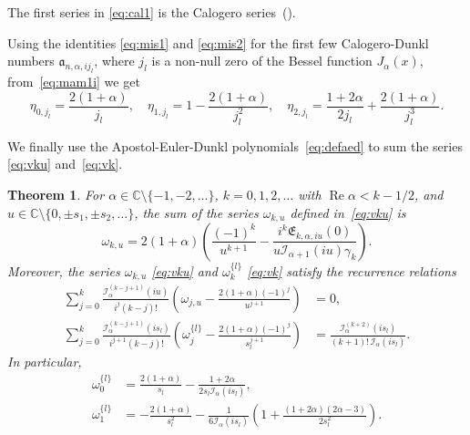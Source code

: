 \documentclass[10pt,a4paper]{article}
\theoremstyle{plain}
\newtheorem{theorem}{Theorem}[section]
\theoremstyle{definition}
\numberwithin{equation}{section} %
\newcommand{\I}{\mathcal{I}}
\newcommand{\am}{\mathfrak{a}}
\newcommand{\E}{\mathfrak{E}}
\newcommand{\CC}{\mathbb{C}}
\newcommand{\cc}{\gamma}
\renewcommand{\Re}{\operatorname{Re}}
\begin{document}
The first series in \eqref{eq:cal1} is the Calogero series~(\cite{Cal}).

Using the identities \eqref{eq:mis1} and \eqref{eq:mis2} for the first few Calogero-Dunkl numbers $\am_{n,\alpha,ij_l}$, where $j_l$ is a non-null zero of
the Bessel function $J_\alpha(x)$, from~\eqref{eq:mam1i} we get
\[
  \eta_{0,j_l} = \frac{2(1+\alpha)}{j_l},\quad \eta_{1,j_l}=1-\frac{2(1+\alpha)}{j_l^2},
  \quad \eta_{2,j_l} = \frac{1+2\alpha}{2j_l}+\frac{2(1+\alpha)}{j_l^3}.
\]

We finally use the Apostol-Euler-Dunkl polynomials~\eqref{eq:defaed} to sum the series \eqref{eq:vku} and~\eqref{eq:vk}.

\begin{theorem}
\label{thm:cag2}
For $\alpha \in \CC\setminus\{-1,-2,\dots\}$, $k=0,1,2,\dots$ with $\Re \alpha < k -1/2$,
and $u\in \CC\setminus\{0, \pm s_1,\pm s_2,\dots\}$, the sum of the series $\omega_{k,u}$ defined in~\eqref{eq:vku} is
\begin{equation}
\label{eq:sumAED}
  \omega_{k,u}
  = 2(1+\alpha) \left(\frac{(-1)^k}{u^{k+1}}
  - \frac{i^k\E_{k,\alpha,iu}(0)}{u\I_{\alpha+1}(iu)\cc_k}\right).
\end{equation}
Moreover, the series $\omega_{k,u}$ \eqref{eq:vku} and $\omega_k^{\{l\}}$ \eqref{eq:vk} satisfy the recurrence relations
\begin{align}
\label{eq:mamp}
  \sum_{j=0}^k \frac{\I_\alpha^{(k-j+1)}(iu)}{i^j(k-j)!}
  \left(\omega_{j,u}-\frac{2(1+\alpha)(-1)^j}{u^{j+1}}\right) &= 0,
  \\
\label{eq:mam5}
  \sum_{j=0}^k \frac{\I_\alpha^{(k-j+1)}(is_l)}{i^{j+1}(k-j)!}
  \left(\omega_j^{\{l\}}-\frac{2(1+\alpha)(-1)^j}{s_l^{j+1}}\right)
  &= \frac{\I_\alpha^{(k+2)}(is_l)}{(k+1)!\,\I_\alpha(is_l)}.
\end{align}
In particular,
\begin{align}
\label{eq:acal1}
  \omega_0^{\{l\}} &= \frac{2(1+\alpha)}{s_l} - \frac{1+2\alpha}{2s_l\I_\alpha(is_l)},\\
\label{eq:acal2}
  \omega_1^{\{l\}} &= -\frac{2(1+\alpha)}{s_l^2} -\frac{1}{6\I_\alpha(is_l)}\left( 1+\frac{(1+2\alpha)(2\alpha-3)}{2s_l^2}\right).
\end{align}
\end{theorem}
\end{document}
